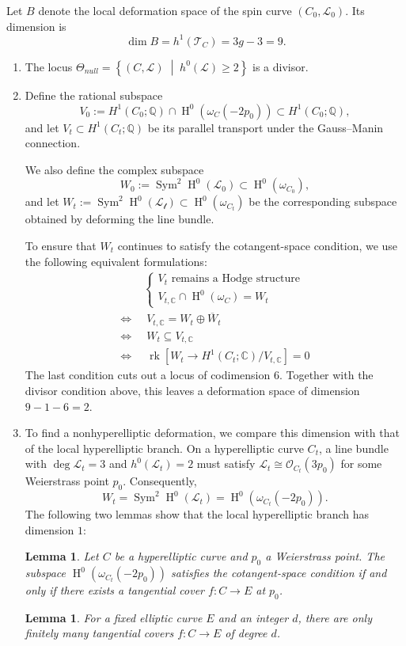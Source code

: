 \documentclass[UTF8]{amsart}
\numberwithin{equation}{section}
\theoremstyle{plain}
\newtheorem{lemma}[theorem]{Lemma}
\numberwithin{equation}{section}
\theoremstyle{remark}
\DeclareMathOperator{\Sym}{\operatorname{Sym}}
\DeclareMathOperator{\rk}{\operatorname{rk}}
\DeclareMathOperator{\Hnm}{\operatorname{H}}
\begin{document}
Let $B$ denote the local deformation space of the spin curve $(C_0,\mathcal{L}_0)$. Its dimension is
$$\dim B = h^1(\mathcal{T}_C)=3g-3=9.$$
\begin{enumerate}
\item The locus $\Theta_{null}= \left\{ (C,\mathcal{L}) \;\middle|\; h^0(\mathcal{L}) \geqslant 2 \right\}$ is a divisor.
\item Define the rational subspace
$$V_0:= H^1(C_0;\mathbb{Q}) \cap \Hnm^0\left(\omega_C(-2p_0)\right) \subset H^1(C_0;\mathbb{Q}),$$
and let $V_t \subset H^1(C_t;\mathbb{Q})$ be its parallel transport under the Gauss--Manin connection.

We also define the complex subspace 
$$W_0:=\Sym^2 \Hnm^0(\mathcal{L_0}) \subset \Hnm^0(\omega_{C_0}),$$
and let $W_t:=\Sym^2 \Hnm^0(\mathcal{L_t})\subset \Hnm^0(\omega_{C_t})$ be the corresponding subspace obtained by deforming the line bundle.

To ensure that $W_t$ continues to satisfy the cotangent-space condition, we use the following equivalent formulations:
\begin{equation*}
\begin{aligned}
   & \begin{cases}
   V_t \text{ remains a Hodge structure}\\
   V_{t,\mathbb{C}} \cap \Hnm^0(\omega_C)=W_t
   \end{cases} \\ 
  \Longleftrightarrow\;& \;V_{t,\mathbb{C}} = W_t \oplus \overline{W}_t  \\ 
  \Longleftrightarrow\;& \; W_t \subseteq V_{t,\mathbb{C}}\\
  \Longleftrightarrow\;& \; \rk \left[W_t \longrightarrow H^1(C_t;\mathbb{C})/ V_{t,\mathbb{C}}\right] =0
\end{aligned}
\end{equation*}
The last condition cuts out a locus of codimension $6$. Together with the divisor condition above, this leaves a deformation space of dimension $9-1-6=2$.

\item To find a nonhyperelliptic deformation, we compare this dimension with that of the local hyperelliptic branch. On a hyperelliptic curve $C_t$, a line bundle with $\deg \mathcal{L}_t=3$ and $h^0 (\mathcal{L}_t)=2$ must satisfy $\mathcal{L}_t \cong \mathcal{O}_{C_t}(3p_0)$ for some Weierstrass point $p_0$. Consequently,
$$W_t= \Sym^2 \Hnm^0(\mathcal{L}_t) = \Hnm^0\left(\omega_{C_t}(-2p_0)\right).$$
The following two lemmas show that the local hyperelliptic branch has dimension $1$:
\begin{lemma}
Let $C$ be a hyperelliptic curve and $p_0$ a Weierstrass point. The subspace
$\Hnm^0\left(\omega_{C_t}(-2p_0)\right)$ satisfies the cotangent-space condition if and only if there exists a tangential cover $f:C \longrightarrow E$ at $p_0$.
\end{lemma}
\begin{lemma}\cite[Proposition 2.5, 3]{treibich2025}
For a fixed elliptic curve $E$ and an integer $d$, there are only finitely many tangential covers $f:C \longrightarrow E$ of degree $d$.
\end{lemma}
\end{enumerate}
\end{document}
